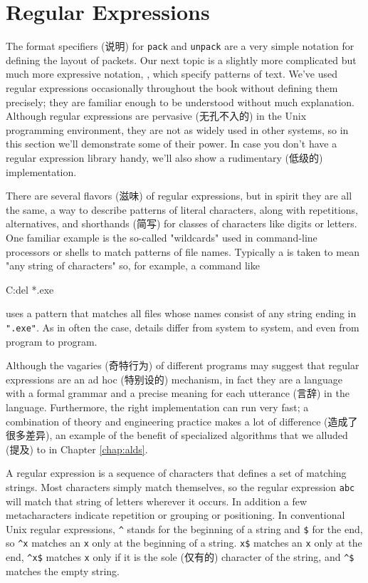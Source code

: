 \section{Regular Expressions}
\label{sec:regular_expressions}

The format specifiers (说明) for \verb'pack' and \verb'unpack' are a very
simple notation for defining the layout of packets. Our next topic is a
slightly more complicated but much more expressive notation,
, which specify patterns of text.
We've used regular expressions occasionally throughout the book without
defining them precisely; they are familiar enough to be understood without
much explanation.  Although regular expressions are pervasive (无孔不入的)
in the Unix programming environment, they are not as widely used in other
systems, so in this section we'll demonstrate some of their power. In case
you don't have a regular expression library handy, we'll also show a
rudimentary (低级的) implementation.

There are several flavors (滋味) of regular expressions, but in spirit they
are all the same, a way to describe patterns of literal characters, along
with repetitions, alternatives, and shorthands (简写) for classes of
characters like digits or letters. One familiar example is the so-called
"wildcards" used in command-line processors or shells to match patterns of
file names. Typically a is taken to mean "any string of characters" so, for
example, a command like
\begin{wellcode}
    C:\>del *.exe
\end{wellcode}
uses a pattern that matches all files whose names consist of any string
ending in \verb'".exe"'. As in often the case, details differ from system
to system, and even from program to program.

Although the vagaries (奇特行为) of different programs may suggest that
regular expressions are an ad hoc (特别设的) mechanism, in fact they are a
language with a formal grammar and a precise meaning for each utterance
(言辞) in the language. Furthermore, the right implementation can run very
fast; a combination of theory and engineering practice makes a lot of
difference (造成了很多差异), an example of the benefit of specialized
algorithms that we alluded (提及) to in Chapter \ref{chap:alds}.

A regular expression is a sequence of characters that defines a set of
matching strings. Most characters simply match themselves, so the regular
expression \verb'abc' will match that string of letters wherever it occurs.
In addition a few metacharacters indicate repetition or grouping or
positioning. In conventional Unix regular expressions, \verb'^' stands for
the beginning of a string and \verb'$' for the end, so \verb'^x' matches an
\verb'x' only at the beginning of a string. \verb'x$' matches an \verb'x'
only at the end, \verb'^x$' matches \verb'x' only if it is the sole
(仅有的) character of the string, and \verb'^$' matches the empty string.

